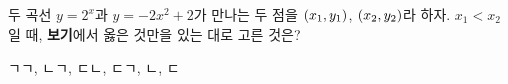 두 곡선 $y=2^x$과 $y=-2x^2+2$가 만나는 두 점을 $(x_1{,}\mkern3mu\mathopen{}y_1)$, $(x_2{,}\mkern3mu\mathopen{}y_2)$라 하자. $x_1<x_2$일 때, \textbf{보기}에서 옳은 것만을 있는 대로 고른 것은? 
\begin{choices32}{ㄱ}{ㄱ, ㄴ}{ㄱ, ㄷ}{ㄴ, ㄷ}{ㄱ, ㄴ, ㄷ}\end{choices32}
